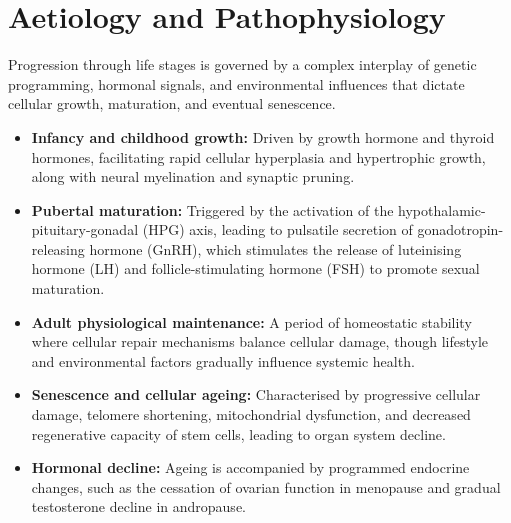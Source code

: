 \section*{Aetiology and Pathophysiology}
Progression through life stages is governed by a complex interplay of genetic programming, hormonal signals, and environmental influences that dictate cellular growth, maturation, and eventual senescence.
\begin{itemize}
    \item \textbf{Infancy and childhood growth:} Driven by growth hormone and thyroid hormones, facilitating rapid cellular hyperplasia and hypertrophic growth, along with neural myelination and synaptic pruning.
    \item \textbf{Pubertal maturation:} Triggered by the activation of the hypothalamic-pituitary-gonadal (HPG) axis, leading to pulsatile secretion of gonadotropin-releasing hormone (GnRH), which stimulates the release of luteinising hormone (LH) and follicle-stimulating hormone (FSH) to promote sexual maturation.
    \item \textbf{Adult physiological maintenance:} A period of homeostatic stability where cellular repair mechanisms balance cellular damage, though lifestyle and environmental factors gradually influence systemic health.
    \item \textbf{Senescence and cellular ageing:} Characterised by progressive cellular damage, telomere shortening, mitochondrial dysfunction, and decreased regenerative capacity of stem cells, leading to organ system decline.
    \item \textbf{Hormonal decline:} Ageing is accompanied by programmed endocrine changes, such as the cessation of ovarian function in menopause and gradual testosterone decline in andropause.
\end{itemize}

